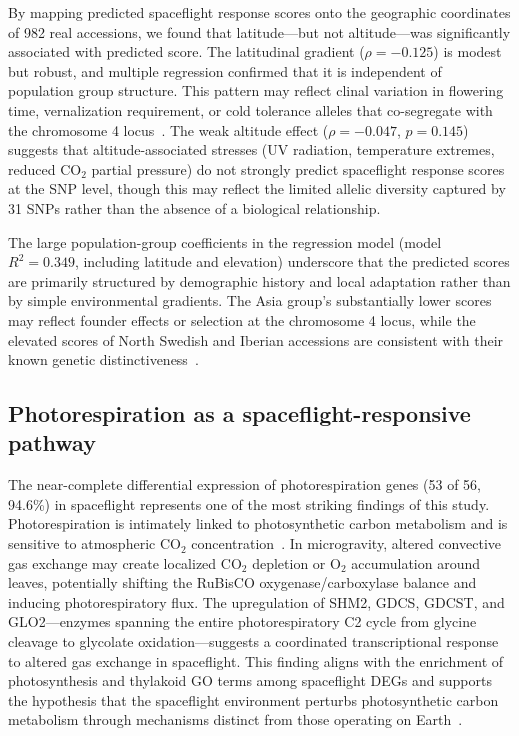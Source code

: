 \documentclass[sn-mathphys-num,Basic]{sn-jnl}
\begin{document}
By mapping predicted spaceflight response scores onto the geographic coordinates of 982 real accessions, we found that latitude---but not altitude---was significantly associated with predicted score. The latitudinal gradient ($\rho = -0.125$) is modest but robust, and multiple regression confirmed that it is independent of population group structure. This pattern may reflect clinal variation in flowering time, vernalization requirement, or cold tolerance alleles that co-segregate with the chromosome 4 locus~\cite{ExpositoAlonso2019,FerreroSerrano2019}. The weak altitude effect ($\rho = -0.047$, $p = 0.145$) suggests that altitude-associated stresses (UV radiation, temperature extremes, reduced CO$_2$ partial pressure) do not strongly predict spaceflight response scores at the SNP level, though this may reflect the limited allelic diversity captured by 31 SNPs rather than the absence of a biological relationship.

The large population-group coefficients in the regression model (model $R^2 = 0.349$, including latitude and elevation) underscore that the predicted scores are primarily structured by demographic history and local adaptation rather than by simple environmental gradients. The Asia group's substantially lower scores may reflect founder effects or selection at the chromosome 4 locus, while the elevated scores of North Swedish and Iberian accessions are consistent with their known genetic distinctiveness~\cite{AlonsoBlanco2016}.

\subsection*{Photorespiration as a spaceflight-responsive pathway}

The near-complete differential expression of photorespiration genes (53 of 56, 94.6\%) in spaceflight represents one of the most striking findings of this study. Photorespiration is intimately linked to photosynthetic carbon metabolism and is sensitive to atmospheric CO$_2$ concentration~\cite{Bauwe2012}. In microgravity, altered convective gas exchange may create localized CO$_2$ depletion or O$_2$ accumulation around leaves, potentially shifting the RuBisCO oxygenase/carboxylase balance and inducing photorespiratory flux. The upregulation of SHM2, GDCS, GDCST, and GLO2---enzymes spanning the entire photorespiratory C2 cycle from glycine cleavage to glycolate oxidation---suggests a coordinated transcriptional response to altered gas exchange in spaceflight. This finding aligns with the enrichment of photosynthesis and thylakoid GO terms among spaceflight DEGs and supports the hypothesis that the spaceflight environment perturbs photosynthetic carbon metabolism through mechanisms distinct from those operating on Earth~\cite{Zhou2024}.
\end{document}
